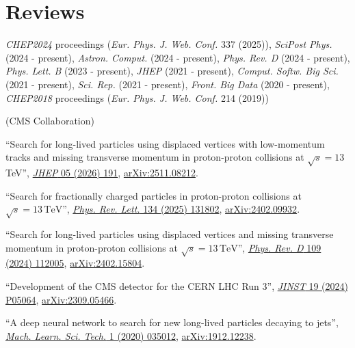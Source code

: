 \section{Reviews}
\begin{description}[leftmargin=12pt,font=\normalfont\textit]
\item[Journal referee:]
\begin{nbdescription}[leftmargin=12pt,font=\normalfont,labelsep=0em]\item[]
\item \emph{CHEP2024} proceedings (\emph{Eur. Phys. J. Web. Conf.} 337 (2025)), \emph{SciPost Phys.} (2024 - present), \emph{Astron. Comput.} (2024 - present), \emph{Phys. Rev. D} (2024 - present), \emph{Phys. Lett. B} (2023 - present), \emph{JHEP} (2021 - present), \emph{Comput. Softw. Big Sci.} (2021 - present), \emph{Sci. Rep.} (2021 - present), \emph{Front. Big Data} (2020 - present), \emph{CHEP2018} proceedings (\emph{Eur. Phys. J. Web. Conf.} 214 (2019))
\end{nbdescription}
\item[Analysis Review Committee (ARC) member:] (CMS Collaboration)
\begin{nbdescription}[leftmargin=12pt,font=\normalfont,labelsep=0em]
\item ``Search for long-lived particles using displaced vertices with low-momentum tracks and missing transverse momentum in proton-proton collisions at $\sqrt{s}=13$ TeV'', \href{https://doi.org/10.1007/JHEP05(2026)191}{\emph{JHEP} 05 (2026) 191}, \href{https://arxiv.org/abs/2511.08212}{arXiv:2511.08212}.
\item ``Search for fractionally charged particles in proton-proton collisions at $\sqrt{s} = 13\,\text{TeV}$'', \href{http://dx.doi.org/10.1103/PhysRevLett.134.131802}{\emph{Phys. Rev. Lett.} 134 (2025) 131802}, \href{https://arxiv.org/abs/2402.09932}{arXiv:2402.09932}.
\item ``Search for long-lived particles using displaced vertices and missing transverse momentum in proton-proton collisions at $\sqrt{s} = 13\,\text{TeV}$'', \href{http://dx.doi.org/10.1103/PhysRevD.109.112005}{\emph{Phys. Rev. D} 109 (2024) 112005}, \href{https://arxiv.org/abs/2402.15804}{arXiv:2402.15804}.
\item ``Development of the CMS detector for the CERN LHC Run 3'', \href{https://doi.org/10.1088/1748-0221/19/05/P05064}{\emph{JINST} 19 (2024) P05064}, \href{https://arxiv.org/abs/2309.05466}{arXiv:2309.05466}.
\item ``A deep neural network to search for new long-lived particles decaying to jets'', \href{https://doi.org/10.1088/2632-2153/ab9023}{\emph{Mach. Learn. Sci. Tech.} 1 (2020) 035012}, \href{https://arxiv.org/abs/1912.12238}{arXiv:1912.12238}.

\end{nbdescription}
\end{description}
